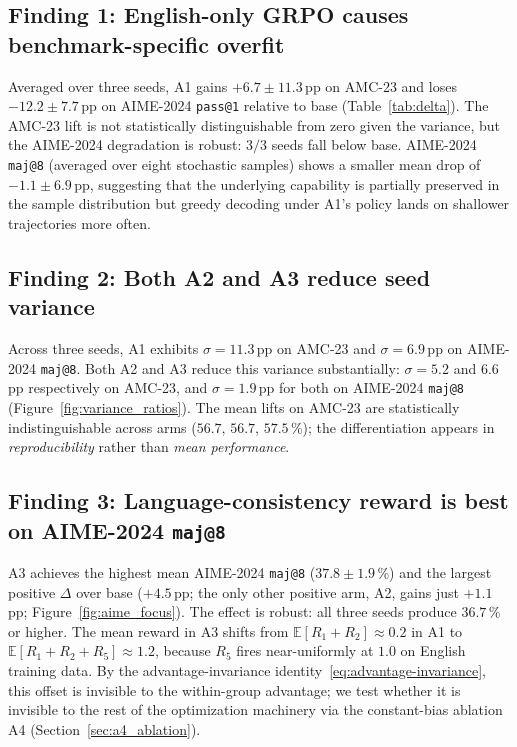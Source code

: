 \documentclass[11pt]{article}
\newcommand{\armA}{\textsc{A1}}
\newcommand{\armB}{\textsc{A2}}
\newcommand{\armC}{\textsc{A3}}
\newcommand{\armD}{\textsc{A4}}
\newcommand{\R}[1]{R_{#1}}
\newcommand{\E}{\mathbb{E}}
\begin{document}
\subsection{Finding 1: English-only GRPO causes benchmark-specific overfit}
\label{sec:finding1}
Averaged over three seeds, \armA{} gains $+6.7 \pm 11.3$\,pp on AMC-23
and loses $-12.2 \pm 7.7$\,pp on AIME-2024 \texttt{pass@1} relative to
base (Table~\ref{tab:delta}). The AMC-23 lift is not statistically
distinguishable from zero given the variance, but the AIME-2024
degradation is robust: $3/3$ seeds fall below base. AIME-2024
\texttt{maj@8} (averaged over eight stochastic samples) shows a smaller
mean drop of $-1.1 \pm 6.9$\,pp, suggesting that the underlying
capability is partially preserved in the sample distribution but greedy
decoding under \armA{}'s policy lands on shallower trajectories more
often.

\subsection{Finding 2: Both \armB{} and \armC{} reduce seed variance}
\label{sec:finding2}
Across three seeds, \armA{} exhibits $\sigma{=}11.3$\,pp on AMC-23 and
$\sigma{=}6.9$\,pp on AIME-2024 \texttt{maj@8}. Both \armB{} and
\armC{} reduce this variance substantially: $\sigma{=}5.2$ and
$6.6$\,pp respectively on AMC-23, and $\sigma{=}1.9$\,pp for both on
AIME-2024 \texttt{maj@8} (Figure~\ref{fig:variance_ratios}). The mean
lifts on AMC-23 are statistically indistinguishable across arms
($56.7$, $56.7$, $57.5$\,\%); the differentiation appears in
\emph{reproducibility} rather than \emph{mean performance}.

\subsection{Finding 3: Language-consistency reward is best on AIME-2024 \texttt{maj@8}}
\label{sec:finding3}
\armC{} achieves the highest mean AIME-2024 \texttt{maj@8}
($37.8 \pm 1.9$\,\%) and the largest positive $\Delta$ over
base ($+4.5$\,pp; the only other positive arm, \armB{}, gains just
$+1.1$\,pp; Figure~\ref{fig:aime_focus}). The effect is robust:
all three seeds produce $36.7$\,\% or higher. The mean reward in
\armC{} shifts from $\E[\R{1}{+}\R{2}]\approx 0.2$ in \armA{} to
$\E[\R{1}{+}\R{2}{+}\R{5}]\approx 1.2$, because $\R{5}$ fires
near-uniformly at $1.0$ on English training data. By the
advantage-invariance identity~\eqref{eq:advantage-invariance}, this
offset is invisible to the within-group advantage; we test whether it
is invisible to the rest of the optimization machinery via the
constant-bias ablation \armD{} (Section~\ref{sec:a4_ablation}).
\end{document}
